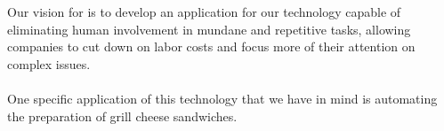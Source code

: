 Our vision for \productname{} is to develop an application for our technology capable of eliminating human involvement in mundane and repetitive tasks, allowing companies to cut down on labor costs and focus more of their attention on complex issues.\\
\\
One specific application of this technology that we have in mind is automating the preparation of grill cheese sandwiches.